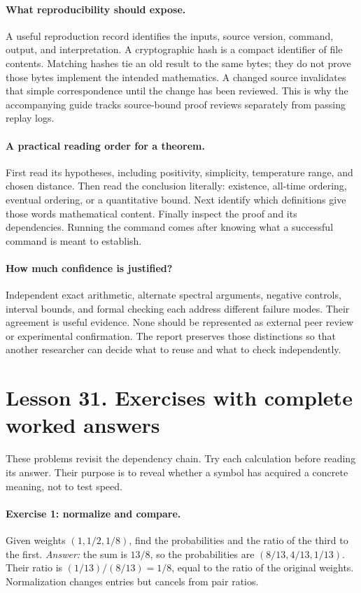 \paragraph{What reproducibility should expose.}
A useful reproduction record identifies the inputs, source version, command,
output, and interpretation. A cryptographic hash is a compact identifier
of file contents. Matching hashes tie an old result to the same bytes;
they do not prove those bytes implement the intended mathematics. A changed
source invalidates that simple correspondence until the change has been
reviewed. This is why the accompanying guide tracks source-bound proof
reviews separately from passing replay logs.

\paragraph{A practical reading order for a theorem.}
First read its hypotheses, including positivity, simplicity, temperature
range, and chosen distance. Then read the conclusion literally: existence,
all-time ordering, eventual ordering, or a quantitative bound. Next identify
which definitions give those words mathematical content. Finally inspect
the proof and its dependencies. Running the command comes after knowing
what a successful command is meant to establish.

\paragraph{How much confidence is justified?}
Independent exact arithmetic, alternate spectral arguments, negative
controls, interval bounds, and formal checking each address different
failure modes. Their agreement is useful evidence. None should be
represented as external peer review or experimental confirmation. The
report preserves those distinctions so that another researcher can decide
what to reuse and what to check independently.

\clearpage
\section*{Lesson 31. Exercises with complete worked answers}
These problems revisit the dependency chain. Try each calculation before
reading its answer. Their purpose is to reveal whether a symbol has acquired
a concrete meaning, not to test speed.

\paragraph{Exercise 1: normalize and compare.}
Given weights $(1,1/2,1/8)$, find the probabilities and the ratio of the
third to the first. \emph{Answer:} the sum is $13/8$, so the probabilities
are $(8/13,4/13,1/13)$. Their ratio is $(1/13)/(8/13)=1/8$, equal to the
ratio of the original weights. Normalization changes entries but cancels
from pair ratios.

